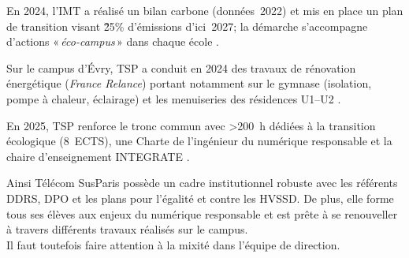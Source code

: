En 2024, l’IMT a réalisé un bilan carbone (données~2022) et mis en place un plan de transition visant \~25\% d’émissions d’ici~2027; la démarche 
s’accompagne d’actions «\,\emph{éco-campus}\,» dans chaque école \cite{transition}.

Sur le campus d’Évry, TSP a conduit en 2024 des travaux de rénovation énergétique (\emph{France Relance}) portant notamment sur le gymnase (isolation, pompe à chaleur, éclairage) et les menuiseries des résidences U1–U2 \cite{renov}.

En 2025, TSP renforce le tronc commun avec >200~h dédiées à la transition écologique (8~ECTS), une Charte de l’ingénieur du numérique responsable et la chaire d’enseignement INTEGRATE \cite{ddrs}.\\
\vspace{0.6em}

Ainsi Télécom SusParis possède un cadre institutionnel robuste avec les référents DDRS, DPO et les plans pour l'égalité et contre les HVSSD.
De plus, elle forme tous ses élèves aux enjeux du numérique responsable et est prête à se renouveller à travers différents travaux réalisés sur le campus.\\
Il faut toutefois faire attention à la mixité dans l'équipe de direction.
